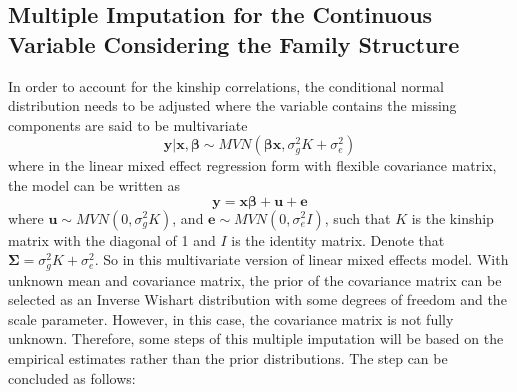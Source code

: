 \documentclass[preprint,12pt]{elsarticle}
\begin{document}
\subsection{Multiple Imputation for the Continuous Variable Considering the Family Structure}
In order to account for the kinship correlations, the conditional normal distribution needs to be adjusted where the variable contains the missing components are said to be multivariate 
\begin{equation} 
    \mathbf{y}|\mathbf{x},\boldsymbol{\beta}\sim MVN(\boldsymbol{\beta}\mathbf{x}, \sigma_g^2K+\sigma_e^2)
\end{equation}
where in the linear mixed effect regression form with flexible covariance matrix, the model can be written as 
\begin{equation} 
    \mathbf{y}=\mathbf{x}\boldsymbol{\beta}+\mathbf{u}+\mathbf{e}
\end{equation}
where $\mathbf{u}\sim MVN(0,\sigma_g^2K)$, and $\mathbf{e}\sim MVN(0,\sigma_e^2I)$, such that $K$ is the kinship matrix with the diagonal of 1 and $I$ is the identity matrix. 
Denote that $\boldsymbol{\Sigma}=\sigma_g^2K+\sigma_e^2$. 
So in this multivariate version of linear mixed effects model. 
With unknown mean and covariance matrix, the prior of the covariance matrix can be selected as an Inverse Wishart distribution with some degrees of freedom and the scale parameter. 
However, in this case, the covariance matrix is not fully unknown. 
Therefore, some steps of this multiple imputation will be based on the empirical estimates rather than the prior distributions. 
The step can be concluded as follows: 
\end{document}
